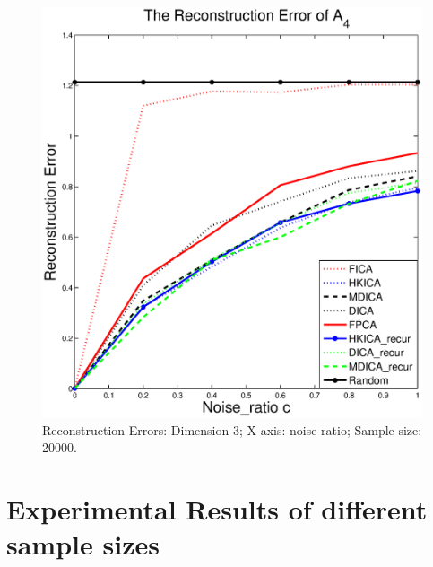 \begin{figure}[t]
	\includegraphics[width =0.45\columnwidth]{error4_d3}
\caption{
\label{fig:Error_d3}
 Reconstruction Errors: Dimension 3; X axis: noise ratio; Sample size: 20000.}
\end{figure}

\section{Experimental Results of different sample sizes}
